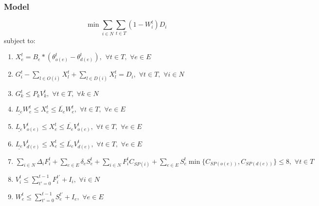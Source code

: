 \documentclass{article}
\begin{document}
	\subsubsection{Model}
	$$	\min \sum_{i \in N} \sum_{t \in T} (1-W_i^t)D_i $$
	subject to:
	\begin{enumerate}[label=(\arabic*), leftmargin=*, itemsep=0.4ex, before={\everymath{\displaystyle}}]%
		
		\item $ X_e^t = B_e * (\theta_{o(e)}^t - \theta_{d(e)}^t), \hspace{5pt} \forall t \in T, \hspace{4pt} \forall e \in E$
		\item $ G_i^t - \sum_{l \in O(i)} X_l^t + \sum_{l \in D(i)} X_l^t = D_i, \hspace{4pt} \forall t \in T, \hspace{4pt} \forall i \in N$
		\item $G_k^t \leq P_{k} V_{k}^t, \hspace{4pt} \forall t \in T, \hspace{4pt} \forall k \in N$
		\item $\underline{L_e}W_{e}^t \leq X_{e}^t \leq \overline{L_e}W_{e}^t, \hspace{4pt} \forall t \in T, \hspace{4pt} \forall e \in E$
		\item $\underline{L_e}V_{o(e)}^t \leq X_{e}^t \leq \overline{L_e}V_{o(e)}^t, \hspace{4pt} \forall t \in T, \hspace{4pt} \forall e \in E$
		\item $\underline{L_e}V_{d(e)}^t \leq X_{e}^t \leq \overline{L_e}V_{d(e)}^t, \hspace{4pt} \forall t \in T, \hspace{4pt} \forall e \in E$
		
		\item $\sum_{i \in N} \Delta_{i} F_{i}^t + \sum_{e \in E} \delta_{e} S_{e}^t + \sum_{i \in N} F_i^t C_{SP(i)} + \sum_{e \in E} S_{e}^t  \min \{C_{SP(o(e))},C_{SP(d(e))} \} \leq 8, \hspace{4pt} \forall t \in T \hspace{4pt}$
		\item $V_i^t \leq \sum_{t'=0}^{t-1} F_i^{t'}+I_i, \hspace{4pt} \forall i \in N$ 
		\item $W_{e}^t \leq \sum_{t'=0}^{t-1} S_{e}^{t'}+I_e, \hspace{4pt} \forall e \in E $
	\end{enumerate}
	
\end{document}
